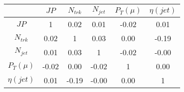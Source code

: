 \begin{tabular}{|c|c|c|c|c|c|} 
\hline
 & $JP$ & $N_{trk}$ & $N_{jet}$ & $P_{T} (\mu)$ & $\eta (jet)$ \\ \hline
$JP$ & 1 & 0.02 & 0.01 & -0.02 & 0.01 \\
$N_{trk}$ & 0.02 & 1 & 0.03 & 0.00 & -0.19 \\
$N_{jet}$ & 0.01 & 0.03 & 1 & -0.02 & -0.00 \\
$P_{T} (\mu)$ & -0.02 & 0.00 & -0.02 & 1 & 0.00 \\
$\eta (jet)$ & 0.01 & -0.19 & -0.00 & 0.00 & 1 \\
\hline 
\end{tabular} 


